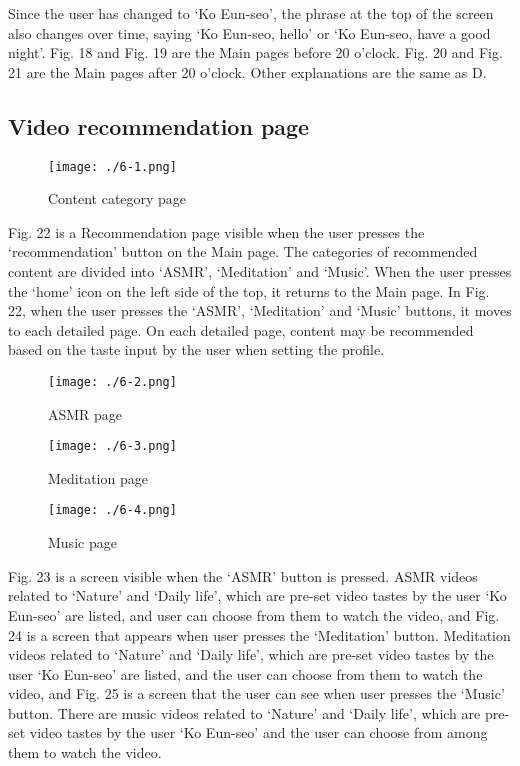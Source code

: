 \documentclass[conference]{IEEEtran}
\begin{document}
Since the user has changed to ‘Ko Eun-seo’, the phrase at the top of the screen also changes over time, saying ‘Ko Eun-seo, hello’ or ‘Ko Eun-seo, have a good night’. Fig. 18 and Fig. 19 are the Main pages before 20 o'clock. Fig. 20 and Fig. 21 are the Main pages after 20 o'clock. Other explanations are the same as D.

\subsection{Video recommendation page}
\begin{figure}[H]
\texttt{[image: ./6-1.png]}
\centering
\caption{Content category page}
\end{figure}

Fig. 22 is a Recommendation page visible when the user presses the ‘recommendation’ button on the Main page. The categories of recommended content are divided into ‘ASMR’, ‘Meditation’ and ‘Music’. When the user presses the ‘home’ icon on the left side of the top, it returns to the Main page. In Fig. 22, when the user presses the ‘ASMR’, ‘Meditation’ and ‘Music’ buttons, it moves to each detailed page. On each detailed page, content may be recommended based on the taste input by the user when setting the profile.

\begin{figure}[H]
\texttt{[image: ./6-2.png]}
\centering
\caption{ASMR page}
\end{figure}

\begin{figure}[H]
\texttt{[image: ./6-3.png]}
\centering
\caption{Meditation page}
\end{figure}

\begin{figure}[H]
\texttt{[image: ./6-4.png]}
\centering
\caption{Music page}
\end{figure}

Fig. 23 is a screen visible when the ‘ASMR’ button is pressed. ASMR videos related to ‘Nature’ and ‘Daily life’, which are pre-set video tastes by the user ‘Ko Eun-seo’ are listed, and user can choose from them to watch the video, and Fig. 24 is a screen that appears when user presses the ‘Meditation’ button. Meditation videos related to ‘Nature’ and ‘Daily life’, which are pre-set video tastes by the user ‘Ko Eun-seo’ are listed, and the user can choose from them to watch the video, and Fig. 25 is a screen that the user can see when user presses the ‘Music’ button. There are music videos related to ‘Nature’ and ‘Daily life’, which are pre-set video tastes by the user ‘Ko Eun-seo’ and the user can choose from among them to watch the video.
\end{document}

